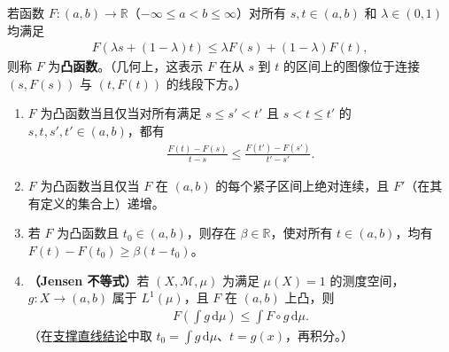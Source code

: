 \documentclass[../../main.tex]{subfiles}%
\begin{document}
\begin{exercise}\label{exercise:ch03-convex-jensen}
\begin{definition*}[凸函数]
若函数 $F:(a,b)\to\mathbb R$（$-\infty\le a<b\le\infty$）对所有 $s,t\in(a,b)$ 和 $\lambda\in(0,1)$ 均满足
\begin{align*}
F(\lambda s+(1-\lambda)t)\le\lambda F(s)+(1-\lambda)F(t),
\end{align*}
则称 $F$ 为\textbf{凸函数}。（几何上，这表示 $F$ 在从 $s$ 到 $t$ 的区间上的图像位于连接 $(s,F(s))$ 与 $(t,F(t))$ 的线段下方。）
\end{definition*}
\begin{enumerate}
\item\label{item:ch03-convex-secants} $F$ 为凸函数当且仅当对所有满足 $s\le s'<t'$ 且 $s<t\le t'$ 的 $s,t,s',t'\in(a,b)$，都有
\begin{align*}
\frac{F(t)-F(s)}{t-s}\le\frac{F(t')-F(s')}{t'-s'}.
\end{align*}
\item\label{item:ch03-convex-derivative} $F$ 为凸函数当且仅当 $F$ 在 $(a,b)$ 的每个紧子区间上绝对连续，且 $F'$（在其有定义的集合上）递增。
\item\label{item:ch03-convex-support} 若 $F$ 为凸函数且 $t_0\in(a,b)$，则存在 $\beta\in\mathbb R$，使对所有 $t\in(a,b)$，均有 $F(t)-F(t_0)\ge\beta(t-t_0)$。
\item\label{item:ch03-jensen} \textbf{（Jensen 不等式）}若 $(X,\mathscr M,\mu)$ 为满足 $\mu(X)=1$ 的测度空间，$g:X\to(a,b)$ 属于 $L^1(\mu)$，且 $F$ 在 $(a,b)$ 上凸，则
\begin{align*}
F\left(\int g\,\mathrm d\mu\right)\le\int F\circ g\,\mathrm d\mu.
\end{align*}
（在\hyperref[item:ch03-convex-support]{支撑直线结论}中取 $t_0=\int g\,\mathrm d\mu$、$t=g(x)$，再积分。）
\end{enumerate}
\end{exercise}
\end{document}
